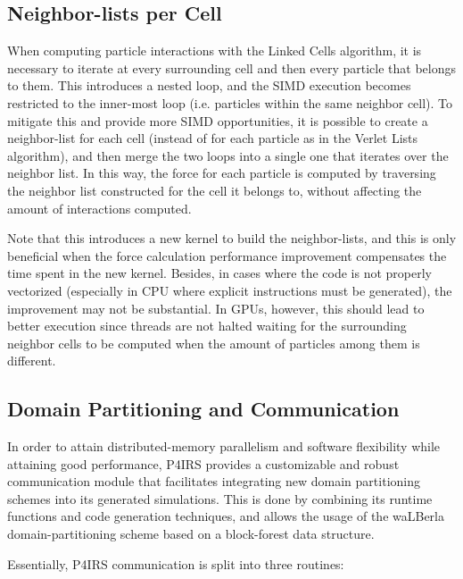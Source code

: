 \documentclass[Afour,sageh,times]{sagej}
\begin{document}
\subsection{Neighbor-lists per Cell}
\label{sec:neighbor_lists_per_cell}

When computing particle interactions with the Linked Cells algorithm, it is necessary to iterate at every surrounding cell and then every particle that belongs to them.
This introduces a nested loop, and the SIMD execution becomes restricted to the inner-most loop (i.e. particles within the same neighbor cell).
To mitigate this and provide more SIMD opportunities, it is possible to create a neighbor-list for each cell (instead of for each particle as in the Verlet Lists algorithm), and then merge the two loops into a single one that iterates over the neighbor list.
In this way, the force for each particle is computed by traversing the neighbor list constructed for the cell it belongs to, without affecting the amount of interactions computed.

Note that this introduces a new kernel to build the neighbor-lists, and this is only beneficial when the force calculation performance improvement compensates the time spent in the new kernel.
Besides, in cases where the code is not properly vectorized (especially in CPU where explicit instructions must be generated), the improvement may not be substantial.
In GPUs, however, this should lead to better execution since threads are not halted waiting for the surrounding neighbor cells to be computed when the amount of particles among them is different.

\subsection{Domain Partitioning and Communication}
\label{sec:domain_partitioning}

In order to attain distributed-memory parallelism and software flexibility while attaining good performance, P4IRS provides a customizable and robust communication module that facilitates integrating new domain partitioning schemes into its generated simulations.
This is done by combining its runtime functions and code generation techniques, and allows the usage of the waLBerla domain-partitioning scheme based on a block-forest data structure.

Essentially, P4IRS communication is split into three routines:
\end{document}
